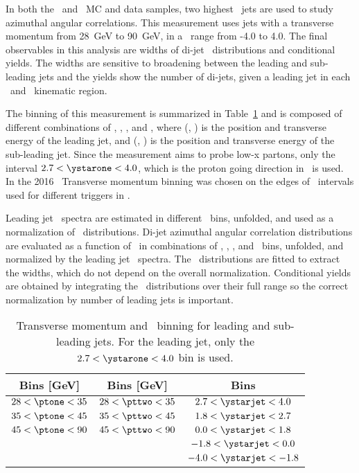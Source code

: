 
In both the \pp\ and \pPb\ MC and data samples, two highest \pt\ jets are used to study azimuthal angular correlations. This measurement uses jets with a transverse momentum from 28~GeV to 90~GeV, in a \ystar\ range from -4.0 to 4.0. The final observables in this analysis are widths of di-jet \Dphi\ distributions and conditional yields. The widths are sensitive to broadening between the leading and sub-leading jets and the yields show the number of di-jets, given a leading jet in each \pT\ and \ystar\ kinematic region. 

The binning of this measurement is summarized in  Table~\ref{tab:binning} and is composed of different combinations of \ystarone, \ystartwo, \ptone, and \pttwo, where (\ystarone, \ptone) is the position and transverse energy of the leading jet, and (\ystartwo, \pttwo) is the position and transverse energy of the sub-leading jet. Since the measurement aims to probe low-x partons, only the interval $2.7<\ystarone<4.0$, which is the proton going direction in \pPb\ is used. In the 2016 \pPb\ Transverse momentum binning was chosen on the edges of \pt\ intervals used for different triggers in \pp. 

Leading jet \ptone\ spectra are estimated in different \ystarone\ bins, unfolded, and used as a normalization of \Dphi\ distributions. Di-jet azimuthal angular correlation distributions are evaluated as a function of \Dphi\ in combinations of \ystarone, \ystartwo, \ptone, and \pttwo\ bins, unfolded, and normalized by the leading jet \pt\ spectra. The \Dphi\ distributions are fitted to extract the widths, which do not depend on the overall normalization. Conditional yields are obtained by integrating the \Dphi\ distributions over their full range so the correct normalization by number of leading jets is important. 

\begin{table}
	\centering
	\begin{tabular}{|| c | c | c || } 
		\hline
		\ptone Bins [GeV] & \pttwo Bins [GeV] & \ystartwo Bins \\ 
		\hline
		$28<\ptone<35$   & $28<\pttwo<35$  & $2.7<\ystarjet<4.0$ \\ 
		$35<\ptone<45$   & $35<\pttwo<45$  & $1.8<\ystarjet<2.7$ \\ 
		$45<\ptone<90$   & $45<\pttwo<90$  & $0.0<\ystarjet<1.8$ \\
						 & 				   & $-1.8<\ystarjet<0.0$ \\
						 &				   & $-4.0<\ystarjet<-1.8$ \\
		\hline
	\end{tabular}
	\caption{\label{tab:binning} Transverse momentum and \ystar\ binning for leading and sub-leading jets. For the leading jet, only the $2.7<\ystarone<4.0$ bin is used. }
\end{table}

